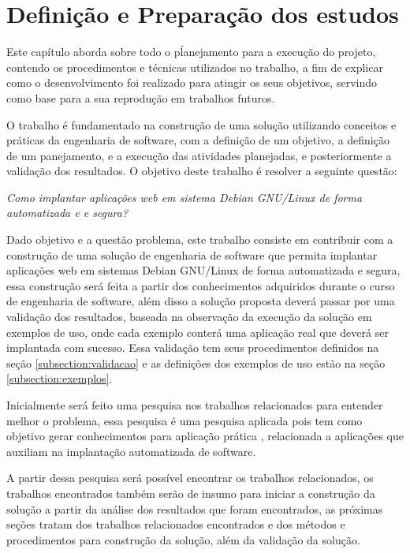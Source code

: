\chapter{Definição e Preparação dos estudos}

\label{cap-metodologia}
Este capítulo aborda sobre todo o pĺanejamento para a execução do projeto,
contendo os procedimentos e técnicas utilizados no trabalho, a fim de
explicar como o desenvolvimento foi realizado para atingir os seus objetivos,
servindo como base para a sua reprodução em trabalhos futuros.

O trabalho é fundamentado na construção de uma solução utilizando conceitos e práticas
da engenharia de software, com a definição de um objetivo, a definição de um panejamento,
e a execução das atividades planejadas, e posteriormente a validação dos resultados.
O objetivo deste trabalho é resolver a seguinte questão:

\begin{center}
  \textit{
  Como implantar aplicações web em sistema Debian GNU/Linux de forma automatizada e
  e segura?
}
\end{center}

Dado objetivo e a questão problema, este trabalho consiste em contribuir
com a construção de uma solução de engenharia de software que permita implantar
aplicações web em sistemas Debian GNU/Linux de forma automatizada e segura, essa
construção será feita a partir dos conhecimentos adquiridos durante
o curso de engenharia de software, além disso a solução proposta deverá passar
por uma validação dos resultados, baseada na observação
da execução da solução em exemplos de uso, onde cada exemplo conterá uma aplicação
real que deverá ser implantada com sucesso. Essa validação tem seus procedimentos
definidos na seção \ref{subsection:validacao} e as definições dos exemplos de uso
estão na seção \ref{subsection:exemplos}.

Inicialmente será feito uma pesquisa nos trabalhos relacionados para entender
melhor o problema, essa pesquisa é uma pesquisa aplicada pois tem como objetivo
gerar conhecimentos para aplicação prática \cite{gerhardt2009metodos},
relacionada a aplicações que auxiliam na implantação automatizada de software.

A partir dessa pesquisa será possível encontrar os trabalhos relacionados, os
trabalhos encontrados também serão de insumo para iniciar
a construção da solução a partir da análise dos resultados que foram encontrados,
as próximas seções tratam dos trabalhos relacionados encontrados e dos métodos e
procedimentos para construção da solução, além da validação da solução.

